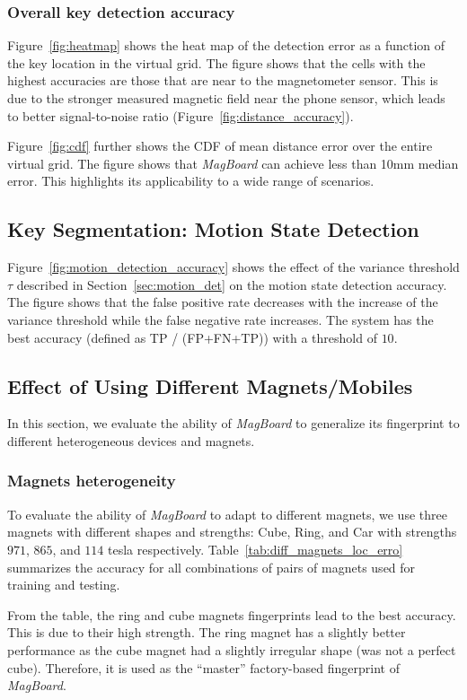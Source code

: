 \documentclass[conference]{IEEEtran}
\def \sys {\textit{MagBoard}}
\begin{document}
\subsubsection{Overall key detection accuracy}
Figure~\ref{fig:heatmap} shows the heat map of the detection error as a function of the key location in the virtual grid. The figure shows that the cells with the highest accuracies are those that are near to the magnetometer sensor. This is due to the stronger measured magnetic field near the phone sensor, which leads to better signal-to-noise ratio (Figure~\ref{fig:distance_accuracy}).

Figure~\ref{fig:cdf} further shows the CDF of mean distance error over the entire virtual grid. The figure shows that \sys{} can achieve 
less than 10mm median error. 
This highlights its applicability to a wide range of scenarios. 

\subsection{Key Segmentation: Motion State Detection}
\label{sec:motion_res}
Figure~\ref{fig:motion_detection_accuracy} shows the effect of the variance threshold $\tau$ described in Section~\ref{sec:motion_det} on the motion state detection accuracy.  The figure shows that the false positive rate decreases with the increase of the variance threshold while the false negative rate increases. The system has the best accuracy (defined as TP / (FP+FN+TP)) with a threshold of $10$.

\subsection{Effect of Using Different Magnets/Mobiles}
In this section, we evaluate the ability of \sys{} to generalize its fingerprint to different heterogeneous devices and magnets.

\subsubsection{Magnets heterogeneity}
To evaluate the ability of \sys{} to adapt to different magnets, we use three magnets with different shapes and strengths: Cube, Ring, and Car with strengths $971$, $865$, and $114$ tesla respectively. 
Table~\ref{tab:diff_magnets_loc_erro} summarizes the accuracy for all combinations of pairs of magnets used for training and testing. 

From the table, the ring and cube magnets fingerprints lead to the best accuracy. This is due to their high strength. The ring magnet has a slightly better performance as the cube magnet had a slightly irregular shape (was not a perfect cube). 
 Therefore, it is used as the ``master'' factory-based fingerprint of \sys{}. 
\end{document}

